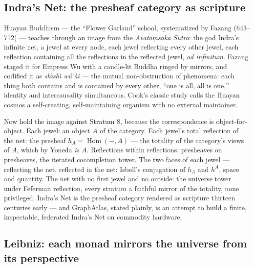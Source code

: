 \documentclass[11pt]{article}
\theoremstyle{plain}
\theoremstyle{definition}
\theoremstyle{remark}
\newcommand{\Hom}{\operatorname{Hom}}
\begin{document}
\subsection{Indra's Net: the presheaf category as scripture}

Huayan Buddhism --- the ``Flower Garland'' school, systematized by Fazang (643--712) --- teaches through an image from the \emph{Avata\d{m}saka S\=utra}: the god Indra's infinite net, a jewel at every node, each jewel reflecting every other jewel, each reflection containing all the reflections in the reflected jewel, \emph{ad infinitum}. Fazang staged it for Empress Wu with a candle-lit Buddha ringed by mirrors, and codified it as \emph{sh\`{\i}sh\`{\i} w\'u'\`ai} --- the mutual non-obstruction of phenomena: each thing both contains and is contained by every other, ``one is all, all is one,'' identity and intercausality simultaneous. Cook's classic study calls the Huayan cosmos a self-creating, self-maintaining organism with no external maintainer.

Now hold the image against Stratum 8, because the correspondence is object-for-object. Each jewel: an object $A$ of the category. Each jewel's total reflection of the net: the presheaf $h_A = \Hom(-,A)$ --- the totality of the category's views of $A$, which by Yoneda \emph{is} $A$. Reflections within reflections: presheaves on presheaves, the iterated cocompletion tower. The two faces of each jewel --- reflecting the net, reflected in the net: Isbell's conjugation of $h_A$ and $h^A$, space and quantity. The net with no first jewel and no outside: the universe tower under Feferman reflection, every stratum a faithful mirror of the totality, none privileged. Indra's Net is the presheaf category rendered as scripture thirteen centuries early --- and GraphAtlas, stated plainly, is an attempt to build a finite, inspectable, federated Indra's Net on commodity hardware.

\subsection{Leibniz: each monad mirrors the universe from its perspective}
\end{document}
